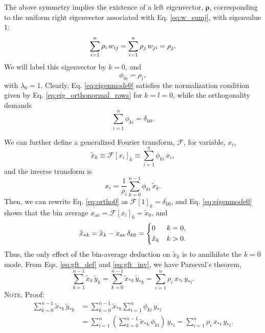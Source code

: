 \documentclass[reprint, superscriptaddress, floatfix]{revtex4-1}
\newcommand{\note}[1]{{\color{DarkGreen}\footnotesize \textsc{Note.} #1}}
\newcommand{\bav}[1]{#1_\mathrm{av}}
\begin{document}
The above symmetry implies the existence of
a left eigenvector, $\pmb \rho$,
corresponding to the uniform right eigenvector
associated with Eq. \eqref{eq:w_sumj},
with eigenvalue $1$:
%
\begin{equation}
  \sum_{i = 1}^n \rho_i \, w_{ij}
  =
  \sum_{i = 1}^n \rho_j \, w_{ji}
  =
  \rho_j
  .
  \notag
\end{equation}
%
We will label this eigenvector by $k = 0$,
and
%
\begin{equation}
  \phi_{0i} = \rho_i,
\label{eq:eigenmode0}
\end{equation}
%
with $\lambda_0 = 1$.
%
Clearly, Eq. \eqref{eq:eigenmode0}
satisfies the normalization condition
given by Eq. \eqref{eq:eig_orthonormal_rows}
for $k = l = 0$,
while the orthogonality demands
%
\begin{equation}
  \sum_{ i = 1 }^n \phi_{ki}
  =
  \delta_{k0}
  .
\label{eq:ortho0}
\end{equation}

We can further define
a generalized Fourier transform, $\mathcal{F}$,
for variable, $x_i$,
%
\begin{equation}
  {\tilde x}_k
  \equiv \mathcal{F}[x_i]_k
  \equiv \sum_{i = 1}^n \phi_{ki} \, x_i
  ,
  \label{eq:gft_def}
\end{equation}
%
and the inverse transform is
%
\begin{equation}
  x_i = \frac{1}{\rho_i} \sum_{k = 0}^{n-1} \phi_{ki} \, \tilde{x}_k
  .
  \label{eq:gft_inv}
\end{equation}
%
Then,
we can rewrite Eq. \eqref{eq:ortho0} as
$\mathcal F[1]_k = \delta_{k0}$,
%
and Eq. \eqref{eq:eigenmode0} shows that
the bin average
$\bav{x}= \mathcal F[x_i]_0 = \tilde x_0$,
%
and
\begin{equation}
  \tilde x_{*k}
  = \tilde x_k - \bav{x} \, \delta_{k0}
  =
  \begin{dcases}
    0           & k = 0
    ,
    \\
    \tilde x_k  & k > 0
    .
  \end{dcases}
  \label{eq:xtstar}
\end{equation}
%
Thus, the only effect
of the bin-average deduction on $\tilde x_k$ is to
annihilate the $k=0$ mode.
%
From Eqs. \eqref{eq:gft_def} and \eqref{eq:gft_inv},
we have Parseval's theorem,
\begin{equation}
  \sum_{k=1}^{n-1} \tilde x_k \, \tilde y_k
  =
  \sum_{k=0}^{n-1} \tilde x_{*k} \, \tilde y_{*k}
  =
  \sum_{i=1}^n \rho_i \, x_{*i} \, y_{*i}
  .
  \label{eq:parseval}
\end{equation}
\note{Proof:
\begin{align*}
  \sum_{k=0}^{n-1} \tilde x_{*k} \, \tilde y_{*k}
  &=
  \sum_{k=0}^{n-1} \tilde x_{*k} \sum_{i=1}^n \phi_{ki} \, y_{*i}
  \\
  &=
  \sum_{i=1}^n \left( \sum_{k=0}^{n-1} \tilde x_{*k} \, \phi_{ki} \right) \, y_{*i}
  =
  \sum_{i=1}^n \rho_i \, x_{*i} \, y_{*i}.
\end{align*}
}
\end{document}
